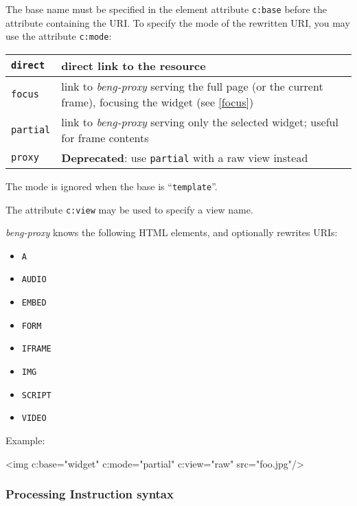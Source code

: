\documentclass[a4paper,12pt]{article}
\begin{document}
The base name must be specified in the element attribute
\texttt{c:base} before the attribute containing the URI.  To specify
the mode of the rewritten URI, you may use the attribute
\texttt{c:mode}:

\label{c_mode}
\begin{tabular}{|l|p{10cm}|}
\hline

\texttt{direct} & direct link to the resource \\

\hline

\texttt{focus} & link to \emph{beng-proxy} serving the full page (or
the current frame), focusing the widget (see \ref{focus}) \\

\hline

\texttt{partial} & link to \emph{beng-proxy} serving only the selected
widget; useful for frame contents \\

\hline

\texttt{proxy} & \textbf{Deprecated}: use \texttt{partial} with a raw
view instead \\

\hline
\end{tabular}

The mode is ignored when the base is ``\texttt{template}''.

The attribute \texttt{c:view} may be used to specify a view name.

\emph{beng-proxy} knows the following HTML elements, and optionally
rewrites URIs:

\begin{itemize}
\item \texttt{A}
\item \texttt{AUDIO}
\item \texttt{EMBED}
\item \texttt{FORM}
\item \texttt{IFRAME}
\item \texttt{IMG}
\item \texttt{SCRIPT}
\item \texttt{VIDEO}
\end{itemize}

Example:

\begin{verbatim*}
<img c:base="widget" c:mode="partial" c:view="raw" src="foo.jpg"/>
\end{verbatim*}

\subsubsection{Processing Instruction syntax}
\end{document}
